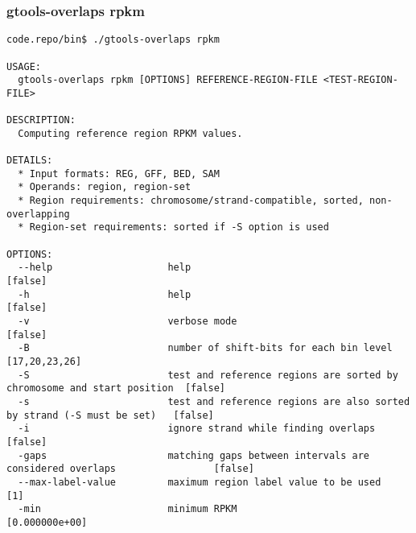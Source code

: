 \subsubsection{gtools-overlaps rpkm}\label{gtools-overlaps_rpkm}
\begin{lstlisting}
code.repo/bin$ ./gtools-overlaps rpkm

USAGE:
  gtools-overlaps rpkm [OPTIONS] REFERENCE-REGION-FILE <TEST-REGION-FILE>

DESCRIPTION:
  Computing reference region RPKM values.

DETAILS:
  * Input formats: REG, GFF, BED, SAM
  * Operands: region, region-set
  * Region requirements: chromosome/strand-compatible, sorted, non-overlapping
  * Region-set requirements: sorted if -S option is used

OPTIONS:
  --help                    help                                                                    [false]
  -h                        help                                                                    [false]
  -v                        verbose mode                                                            [false]
  -B                        number of shift-bits for each bin level                                 [17,20,23,26]
  -S                        test and reference regions are sorted by chromosome and start position  [false]
  -s                        test and reference regions are also sorted by strand (-S must be set)   [false]
  -i                        ignore strand while finding overlaps                                    [false]
  -gaps                     matching gaps between intervals are considered overlaps                 [false]
  --max-label-value         maximum region label value to be used                                   [1]
  -min                      minimum RPKM                                                            [0.000000e+00]
\end{lstlisting}
%
